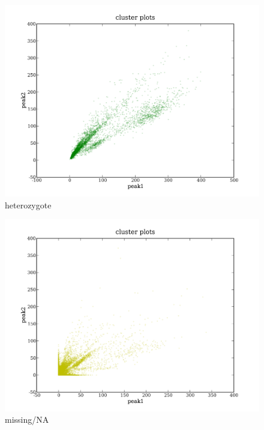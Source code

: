 \documentclass[a4paper,10pt]{article}
\begin{document}
\begin{figure}
\includegraphics[width=1\textwidth]{figures/cluster_plots_het.png}
\caption{heterozygote}\label{f3}
\end{figure}

\begin{figure}
\includegraphics[width=1\textwidth]{figures/cluster_plots_NA.png}
\caption{missing/NA}\label{f4}
\end{figure}
\end{document}
